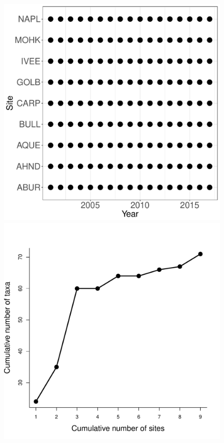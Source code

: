 \documentclass[11pt, oneside]{article}
\begin{document}
\begin{figure}[h!]
\includegraphics[scale = 0.4]{sbc-sessileInverts-castorani_spatiotemporal_sampling_effort.pdf}
\includegraphics[scale = 0.4]{sbc-sessileInverts-castorani_species_accumulation_space.pdf}

\end{figure}
\end{document}
